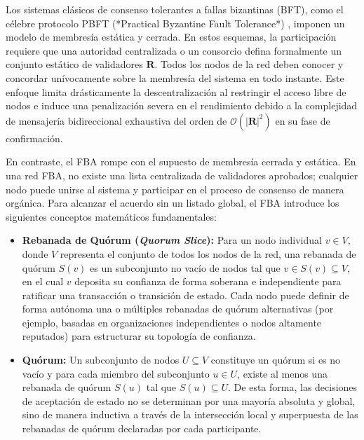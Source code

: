 Los sistemas clásicos de consenso tolerantes a fallas bizantinas (BFT), como el célebre protocolo PBFT (*Practical Byzantine Fault Tolerance*) \cite{castro1999practical}, imponen un modelo de membresía estática y cerrada. En estos esquemas, la participación requiere que una autoridad centralizada o un consorcio defina formalmente un conjunto estático de validadores $\mathbf{R}$. Todos los nodos de la red deben conocer y concordar unívocamente sobre la membresía del sistema en todo instante. Este enfoque limita drásticamente la descentralización al restringir el acceso libre de nodos e induce una penalización severa en el rendimiento debido a la complejidad de mensajería bidireccional exhaustiva del orden de $\mathcal{O}(|\mathbf{R}|^2)$ en su fase de confirmación.

En contraste, el FBA rompe con el supuesto de membresía cerrada y estática. En una red FBA, no existe una lista centralizada de validadores aprobados; cualquier nodo puede unirse al sistema y participar en el proceso de consenso de manera orgánica. Para alcanzar el acuerdo sin un listado global, el FBA introduce los siguientes conceptos matemáticos fundamentales:
\begin{itemize}\setlength{\itemsep}{2pt}
    \item \textbf{Rebanada de Quórum (\textit{Quorum Slice}):} Para un nodo individual $v \in V$, donde $V$ representa el conjunto de todos los nodos de la red, una rebanada de quórum $S(v)$ es un subconjunto no vacío de nodos tal que $v \in S(v) \subseteq V$, en el cual $v$ deposita su confianza de forma soberana e independiente para ratificar una transacción o transición de estado. Cada nodo puede definir de forma autónoma una o múltiples rebanadas de quórum alternativas (por ejemplo, basadas en organizaciones independientes o nodos altamente reputados) para estructurar su topología de confianza.
    \item \textbf{Quórum:} Un subconjunto de nodos $U \subseteq V$ constituye un quórum si es no vacío y para cada miembro del subconjunto $u \in U$, existe al menos una rebanada de quórum $S(u)$ tal que $S(u) \subseteq U$. De esta forma, las decisiones de aceptación de estado no se determinan por una mayoría absoluta y global, sino de manera inductiva a través de la intersección local y superpuesta de las rebanadas de quórum declaradas por cada participante.
\end{itemize}

